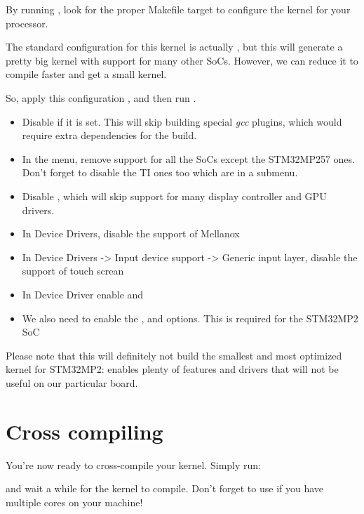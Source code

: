 By running , look for the proper Makefile target to
configure the kernel for your processor.

The standard configuration for this kernel is actually ,
but this will generate a pretty big kernel with support for many other
SoCs. However, we can reduce it to compile faster and get a small
kernel.

So, apply this configuration , and then run .


\begin{itemize}

\item Disable  if it is set. This will skip
  building special {\em gcc} plugins, which would require extra dependencies
  for the build.
\item In the  menu, remove support for all the SoCs except
  the STM32MP257 ones. Don't forget to disable the TI ones too which are
  in a submenu.
\item Disable , which will skip support for many display
controller and GPU drivers.
\item In Device Drivers, disable the support of Mellanox 
\item In Device Drivers -> Input device support -> Generic input layer, 
      disable the support of touch screan 
\item In Device Driver enable  and 
\item We also need to enable the , 
      and  options. This is required for the STM32MP2 SoC
\end{itemize}


Please note that this will definitely not build the smallest
and most optimized kernel for STM32MP2: 
enables plenty of features and drivers that will not be useful on our
particular board.

\section{Cross compiling}

You're now ready to cross-compile your kernel. Simply run:


and wait a while for the kernel to compile. Don't forget to use
 if you have multiple cores on your machine!

